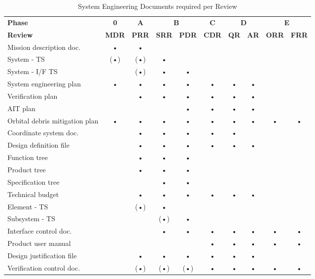 \begin{table}[h]
\centering
\begin{tabular}{l c c c c c c c c c}
\toprule
\textbf{Phase} & \textbf{0} & \textbf{A} & \multicolumn{2}{c}{\textbf{B}} & \textbf{C} & \multicolumn{2}{c}{\textbf{D}} & \multicolumn{2}{c}{\textbf{E}} \\
\textbf{Review} & \textbf{MDR} & \textbf{PRR} & \textbf{SRR} & \textbf{PDR} & \textbf{CDR} & \textbf{QR} & \textbf{AR} & \textbf{ORR} & \textbf{FRR} \\
\midrule
Mission description doc.    	& • & • &   &   &   &   &   &   &   \\
\hline
System - TS              	    &(•)&(•)& • &   &   &   &   &   &   \\
\hline
System - I/F TS          	    &   &(•)& • & • &   &   &   &   &   \\
\hline
System engineering plan		    & • & • & • & • & • & • & • &   &   \\
\hline
Verification plan 		        &   & • & • & • & • & • & • &   &   \\
\hline
AIT plan						&   &   &   & • & • & • & • &   &   \\
\hline
Orbital debris mitigation plan	& • & • & • & • & • & • & • & • & • \\
\hline
Coordinate system doc.       	&   & • & • & • & • & • &   &   &   \\
\hline
\hline
Design definition file       	&   & • & • & • & • & • & • &   &   \\
\hline
Function tree               	&   & • & • & • &   &   &   &   &   \\
\hline
Product tree	                &   & • & • & • &   &   &   &   &   \\
\hline
Specification tree           	&   &   & • & • &   &   &   &   &   \\
\hline
Technical budget            	&   & • & • & • & • & • & • &   &   \\
\hline
Element - TS                    &   &(•)& • &   &   &   &   &   &   \\
\hline
Subsystem - TS                  &   &   &(•)& • &   &   &   &   &   \\
\hline
Interface control doc.          &   &   & • & • & • & • & • & • & • \\
\hline
Product user manual  	        &   &   &   &   & • & • & • & • & • \\
\hline
\hline
Design justification file      	&   & • & • & • & • & • & • &   &   \\
\hline
Verification control doc.       &   &(•)&(•)&(•)& • & • & • & • & • \\
\bottomrule
\end{tabular}
\caption{System Engineering Documents required per Review}
\end{table}

